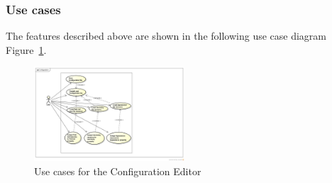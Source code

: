 \subsubsection{Use cases}

The features described above are shown in the following use case diagram Figure~\ref{fig:use-cases-configuration}.

\begin{figure}[htp]
\begin{center}
  \includegraphics[width=0.5\textwidth]{image/uc-configuration.png}
  \caption{Use cases for the Configuration Editor}
  \label{fig:use-cases-configuration}
\end{center}
\end{figure}